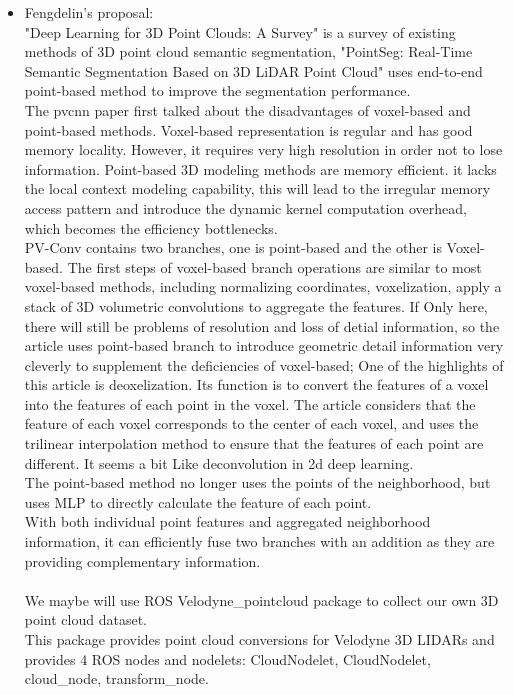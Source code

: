\documentclass{article}
\begin{document}
\begin{normalsize}
\begin{itemize}
\item Fengdelin's proposal:
\\
"Deep Learning for 3D Point Clouds: A Survey"\cite{9127813} is a survey of existing methods of 3D point cloud semantic segmentation, "PointSeg: Real-Time Semantic Segmentation Based on 3D LiDAR Point Cloud" uses end-to-end point-based method to improve the segmentation performance.\cite{2018PointSeg}
\\
The pvcnn paper\cite{pvcnn} first talked about the disadvantages of voxel-based and point-based methods. Voxel-based representation is regular and has good memory locality. However, it requires very high resolution in order not to lose information. Point-based 3D modeling methods are memory efficient. it lacks the local context modeling capability, this will lead to the irregular memory access pattern and introduce the dynamic kernel computation overhead, which becomes the efficiency bottlenecks.\\
PV-Conv contains two branches, one is point-based and the other is Voxel-based.
The first steps of voxel-based branch operations are similar to most voxel-based methods, including normalizing coordinates, voxelization, apply a stack of 3D volumetric convolutions to aggregate the features. If Only here, there will still be problems of resolution and loss of detial information, so the article uses point-based branch to introduce geometric detail information very cleverly to supplement the deficiencies of voxel-based;
One of the highlights of this article is deoxelization. Its function is to convert the features of a voxel into the features of each point in the voxel. The article considers that the feature of each voxel corresponds to the center of each voxel, and uses the trilinear interpolation method to ensure that the features of each point are different. It seems a bit Like deconvolution in 2d deep learning.\\
The point-based method no longer uses the points of the neighborhood, but uses MLP to directly calculate the feature of each point.\\
With both individual point features and aggregated neighborhood information, it can efficiently fuse two branches with an addition as they are providing complementary information.\\
\\
We maybe will use ROS Velodyne\_pointcloud package to collect our own 3D point cloud dataset.\\
This package provides point cloud conversions for Velodyne 3D LIDARs and provides 4 ROS nodes and nodelets: CloudNodelet, CloudNodelet, cloud\_node, transform\_node. \\

\end{itemize}
\end{normalsize}
\end{document}
